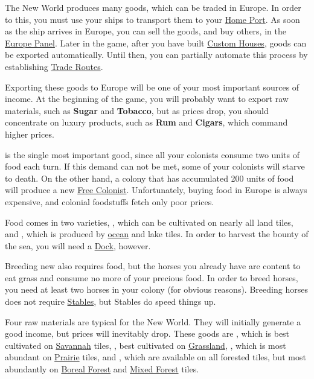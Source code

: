 \documentclass[12pt]{book}
\begin{document}
The New World produces many goods, which can be traded in Europe. In
order to this, you must use your ships to transport them to your
\hyperlink{Home Port}{Home Port}. As soon as the ship arrives in
Europe, you can sell the goods, and buy others, in the
\hyperlink{europe panel}{Europe Panel}. Later in the game, after you
have built \hyperlink{Custom House}{Custom Houses}, goods can be
exported automatically. Until then, you can partially automate this
process by establishing \hyperlink{Trade Routes}{Trade Routes}.

Exporting these goods to Europe will be one of your most important
sources of income. At the beginning of the game, you will probably
want to export raw materials, such as \textbf{Sugar} and
\textbf{Tobacco}, but as prices drop, you should concentrate on luxury
products, such as \textbf{Rum} and \textbf{Cigars}, which command
higher prices.

 is the single most important good, since all your
colonists consume two units of food each turn. If this demand can not
be met, some of your colonists will starve to death.  On the other
hand, a colony that has accumulated 200 units of food will produce a
new \hyperlink{Free Colonist}{Free Colonist}. Unfortunately, buying
food in Europe is always expensive, and colonial foodstuffs fetch only
poor prices.

Food comes in two varieties, , which can be cultivated on
nearly all land tiles, and , which is produced by
\hyperlink{Ocean}{ocean} and lake tiles. In order to harvest the
bounty of the sea, you will need a \hyperlink{Dock}{Dock}, however.

Breeding new  also requires food, but the horses you
already have are content to eat grass and consume no more of your
precious food. In order to breed horses, you need at least two horses
in your colony (for obvious reasons). Breeding horses does not require
\hyperlink{Stables}{Stables}, but Stables do speed things up.

Four raw materials are typical for the New World. They will initially
generate a good income, but prices will inevitably drop. These goods
are , which is best cultivated on
\hyperlink{Savannah}{Savannah} tiles, , best cultivated
on \hyperlink{Grassland}{Grassland}, , which is most
abundant on \hyperlink{Prairie}{Prairie} tiles, and ,
which are available on all forested tiles, but most abundantly on
\hyperlink{Boreal Forest}{Boreal Forest} and \hyperlink{Mixed
Forest}{Mixed Forest} tiles.
\end{document}
